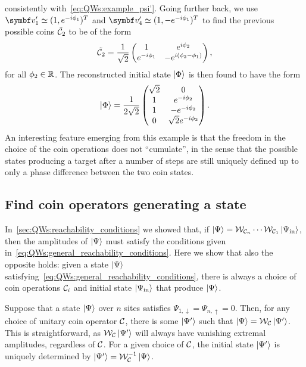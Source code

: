 \begin{example}[label=ex:QWs:conditions_few_steps]
\begin{equation}
    \end{equation}
    consistently with~\cref{eq:QWs:example_psi'}.
    Going further back, we use $\bs v_1'\simeq(1,e^{-i\phi_1})^T$ and $\bs v_4'\simeq(1,-e^{-i\phi_1})^T$ to find the previous possible coins $\tilde{{\mathcal{C}}}_2$ to be of the form
    \begin{equation}
        \tilde{{\mathcal{C}}}_2 = \frac{1}{\sqrt2} \begin{pmatrix}
            1 & e^{i\phi_2} \\
            e^{-i\phi_1} & -e^{i(\phi_2-\phi_1)}
        \end{pmatrix},
    \end{equation}
    for all $\phi_2\in{\mathbb{R}}$. The reconstructed initial state $\ket\Phi$ is then found to have the form
    \begin{equation}
        \ket\Phi = \frac{1}{2\sqrt2}
        \begin{pmatrix}
            \sqrt2 & 0 \\
            1 & e^{-i\phi_2} \\
            1 & -e^{-i\phi_2} \\
            0 & \sqrt2 e^{-i\phi_2}
        \end{pmatrix}.
    \end{equation}
    An interesting feature emerging from this example is that the freedom in the choice of the coin operations does not ``cumulate'', in the sense that the possible states producing a target after a number of steps are still uniquely defined up to only a phase difference between the two coin states.
\end{example}

\subsection{Find coin operators generating a state}
\label{sec:QWs:coin_operators_generating_state}

In~\cref{sec:QWs:reachability_conditions} we showed that, if $\ket\Psi={\mathcal{W}}_{{\mathcal{C}}_n}\cdots{\mathcal{W}}_{{\mathcal{C}}_1}\ket{\Psi_{\operatorname{in}}}$, then the amplitudes of $\ket\Psi$ must satisfy the conditions given in~\cref{eq:QWs:general_reachability_conditions}.
Here we show that also the opposite holds: given a state $\ket\Psi$ satisfying~\cref{eq:QWs:general_reachability_conditions}, there is always a choice of coin operations ${\mathcal{C}}_i$ and initial state $\ket{\Psi_{\operatorname{in}}}$ that produce $\ket\Psi$.

Suppose that a state $\ket\Psi$ over $n$ sites satisfies $\Psi_{1,\downarrow}=\Psi_{n,\uparrow}=0$. Then, for any choice of unitary coin operator ${\mathcal{C}}$, there is some $\ket{\Psi'}$ such that $\ket\Psi={\mathcal{W}}_{\mathcal{C}}\ket{\Psi'}$.
This is straightforward, as ${\mathcal{W}}_{\mathcal{C}}\ket{\Psi'}$ will always have vanishing extremal amplitudes, regardless of ${\mathcal{C}}$. For a given choice of ${\mathcal{C}}$, the initial state $\ket{\Psi'}$ is uniquely determined by $\ket{\Psi'}={\mathcal{W}}_{\mathcal{C}}^{-1}\ket\Psi$.

